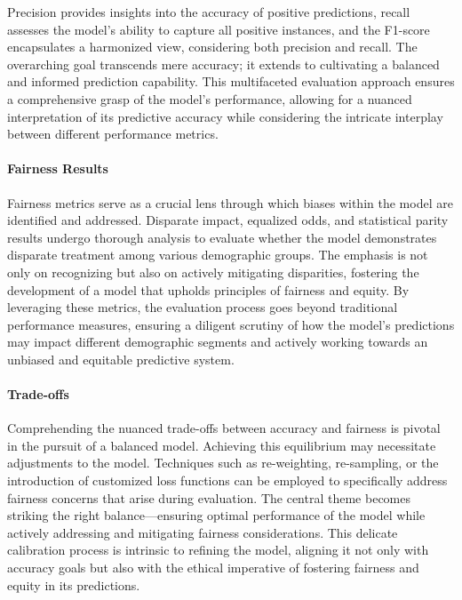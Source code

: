 Precision provides insights into the accuracy of positive predictions, recall assesses the model's ability to capture all positive instances, and the F1-score encapsulates a harmonized view, considering both precision and recall. The overarching goal transcends mere accuracy; it extends to cultivating a balanced and informed prediction capability. This multifaceted evaluation approach ensures a comprehensive grasp of the model's performance, allowing for a nuanced interpretation of its predictive accuracy while considering the intricate interplay between different performance metrics.

\paragraph{Fairness Results}

Fairness metrics serve as a crucial lens through which biases within the model are identified and addressed. Disparate impact, equalized odds, and statistical parity results undergo thorough analysis to evaluate whether the model demonstrates disparate treatment among various demographic groups. The emphasis is not only on recognizing but also on actively mitigating disparities, fostering the development of a model that upholds principles of fairness and equity. By leveraging these metrics, the evaluation process goes beyond traditional performance measures, ensuring a diligent scrutiny of how the model's predictions may impact different demographic segments and actively working towards an unbiased and equitable predictive system.

\paragraph{Trade-offs}

Comprehending the nuanced trade-offs between accuracy and fairness is pivotal in the pursuit of a balanced model. Achieving this equilibrium may necessitate adjustments to the model. Techniques such as re-weighting, re-sampling, or the introduction of customized loss functions can be employed to specifically address fairness concerns that arise during evaluation. The central theme becomes striking the right balance—ensuring optimal performance of the model while actively addressing and mitigating fairness considerations. This delicate calibration process is intrinsic to refining the model, aligning it not only with accuracy goals but also with the ethical imperative of fostering fairness and equity in its predictions.

